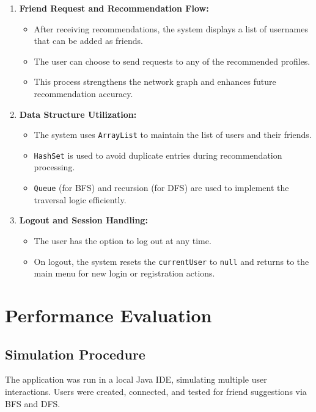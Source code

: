 \documentclass[12pt]{report}
\begin{document}
\begin{enumerate}
    \item \textbf{Friend Request and Recommendation Flow:}
    \begin{itemize}
        \item After receiving recommendations, the system displays a list of usernames that can be added as friends.
        \item The user can choose to send requests to any of the recommended profiles.
        \item This process strengthens the network graph and enhances future recommendation accuracy.
    \end{itemize}

    \item \textbf{Data Structure Utilization:}
    \begin{itemize}
        \item The system uses \texttt{ArrayList} to maintain the list of users and their friends.
        \item \texttt{HashSet} is used to avoid duplicate entries during recommendation processing.
        \item \texttt{Queue} (for BFS) and recursion (for DFS) are used to implement the traversal logic efficiently.
    \end{itemize}
    
    \item \textbf{Logout and Session Handling:}
    \begin{itemize}
        \item The user has the option to log out at any time.
        \item On logout, the system resets the \texttt{currentUser} to \texttt{null} and returns to the main menu for new login or registration actions.
    \end{itemize}
\end{enumerate}









\newpage
\chapter{Performance Evaluation}

\section{Simulation Procedure}
The application was run in a local Java IDE, simulating multiple user interactions. Users
were created, connected, and tested for friend suggestions via BFS and DFS.
\end{document}
